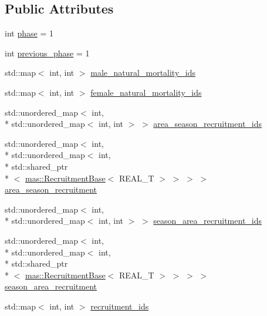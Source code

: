 \subsection*{Public Attributes}
\begin{DoxyCompactItemize}
\item 
int \hyperlink{classmas_1_1_population_ac1239c7b55a78c996eceb83c8c399a0b}{phase} = 1
\item 
int \hyperlink{classmas_1_1_population_a69ed32e9b8a91451da22927333ed7b76}{previous\-\_\-phase} = 1
\item 
std\-::map$<$ int, int $>$ \hyperlink{classmas_1_1_population_a5448f2e0761a208a5184f754b3efbbc6}{male\-\_\-natural\-\_\-mortality\-\_\-ids}
\item 
std\-::map$<$ int, int $>$ \hyperlink{classmas_1_1_population_a87a2beba70c06531b7fcfab50f0ab76d}{female\-\_\-natural\-\_\-mortality\-\_\-ids}
\item 
std\-::unordered\-\_\-map$<$ int, \\*
std\-::unordered\-\_\-map$<$ int, int $>$ $>$ \hyperlink{classmas_1_1_population_a06d567e1aee12655a0442ff6e79464b7}{area\-\_\-season\-\_\-recruitment\-\_\-ids}
\item 
std\-::unordered\-\_\-map$<$ int, \\*
std\-::unordered\-\_\-map$<$ int, \\*
std\-::shared\-\_\-ptr\\*
$<$ \hyperlink{structmas_1_1_recruitment_base}{mas\-::\-Recruitment\-Base}$<$ R\-E\-A\-L\-\_\-\-T $>$ $>$ $>$ $>$ \hyperlink{classmas_1_1_population_ae6b75bd5f2b821e43b3b256255f1b8d6}{area\-\_\-season\-\_\-recruitment}
\item 
std\-::unordered\-\_\-map$<$ int, \\*
std\-::unordered\-\_\-map$<$ int, int $>$ $>$ \hyperlink{classmas_1_1_population_ada1429ef3172d164cffc39fce103454b}{season\-\_\-area\-\_\-recruitment\-\_\-ids}
\item 
std\-::unordered\-\_\-map$<$ int, \\*
std\-::unordered\-\_\-map$<$ int, \\*
std\-::shared\-\_\-ptr\\*
$<$ \hyperlink{structmas_1_1_recruitment_base}{mas\-::\-Recruitment\-Base}$<$ R\-E\-A\-L\-\_\-\-T $>$ $>$ $>$ $>$ \hyperlink{classmas_1_1_population_a4447806c7275aaf07e7d205c94754405}{season\-\_\-area\-\_\-recruitment}
\item 
std\-::map$<$ int, int $>$ \hyperlink{classmas_1_1_population_a37e238439828debf37c7d69b952c52d4}{recruitment\-\_\-ids}

\end{DoxyCompactItemize}
